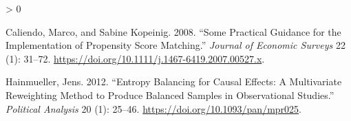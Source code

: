 \documentclass[
  12pt,
]{article}
\newlength{\cslhangindent}
\newenvironment{CSLReferences}[2] %
 {%
  \setlength{\parindent}{0pt}
  \ifodd #1 \everypar{\setlength{\hangindent}{\cslhangindent}}\ignorespaces\fi
  \ifnum #2 > 0
  \setlength{\parskip}{#2\baselineskip}
  \fi
 }%
 {}
\begin{document}
\hypertarget{refs}{}
\begin{CSLReferences}{1}{0}
\leavevmode\hypertarget{ref-Caliendo2008}{}%
Caliendo, Marco, and Sabine Kopeinig. 2008. {``Some {Practical Guidance} for the {Implementation} of {Propensity Score Matching}.''} \emph{Journal of Economic Surveys} 22 (1): 31--72. \url{https://doi.org/10.1111/j.1467-6419.2007.00527.x}.

\leavevmode\hypertarget{ref-Hainmueller2012}{}%
Hainmueller, Jens. 2012. {``Entropy {Balancing} for {Causal Effects}: {A Multivariate Reweighting Method} to {Produce Balanced Samples} in {Observational Studies}.''} \emph{Political Analysis} 20 (1): 25--46. \url{https://doi.org/10.1093/pan/mpr025}.

\end{CSLReferences}
\end{document}
